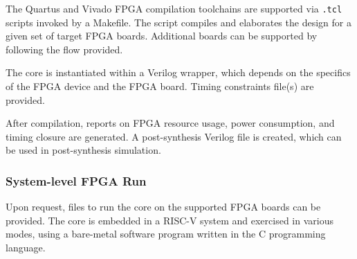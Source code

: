 The Quartus and Vivado FPGA compilation toolchains are supported via {\tt .tcl}
scripts invoked by a Makefile. The script compiles and elaborates the design for
a given set of target FPGA boards. Additional boards can be supported by
following the flow provided.

The core is instantiated within a Verilog wrapper, which depends on the
specifics of the FPGA device and the FPGA board. Timing constraints file(s) are
provided.

After compilation, reports on FPGA resource usage, power consumption, and timing
closure are generated. A post-synthesis Verilog file is created, which can be
used in post-synthesis simulation.



\subsubsection*{System-level FPGA Run}

Upon request, files to run the core on the supported FPGA boards can be
provided. The core is embedded in a RISC-V system and exercised in various
modes, using a bare-metal software program written in the C programming
language.
